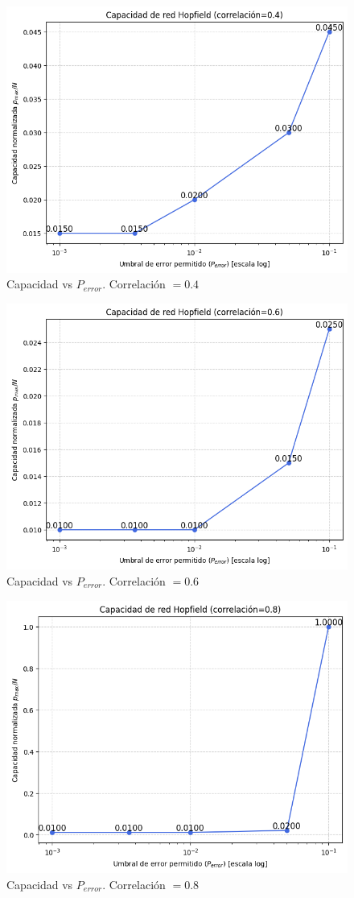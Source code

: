 \documentclass[11pt]{article} %
\begin{document}
\begin{figure}[h!]
    \centering
    \includegraphics[width=0.8\linewidth]{imgs/ej2_2_2.png}
    \caption{Capacidad vs $P_{error}$. Correlación $= 0.4$}
    \label{fig:ej2_2_2}
\end{figure}

\begin{figure}[h!]
    \centering
    \includegraphics[width=0.8\linewidth]{imgs/ej2_2_3.png}
    \caption{Capacidad vs $P_{error}$. Correlación $= 0.6$}
    \label{fig:ej2_2_3}
\end{figure}

\begin{figure}[h!]
    \centering
    \includegraphics[width=0.8\linewidth]{imgs/ej2_2_4.png}
    \caption{Capacidad vs $P_{error}$. Correlación $= 0.8$}
    \label{fig:ej2_2_4}
\end{figure}
\end{document}
